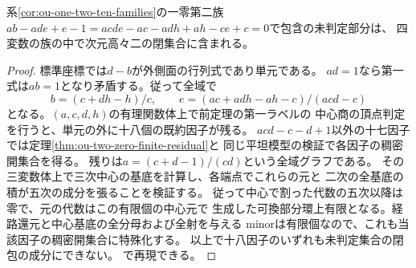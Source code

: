 \begin{corollary}[一零第二族での次元二の上界]
\label{cor:ou-one-zero-second-codim-five}
系\ref{cor:ou-one-two-ten-families}の一零第二族
$ab-ade+e-1=acde-ac-adh+ah-ce+c=0$で包含の未判定部分は、
四変数の族の中で次元高々二の閉集合に含まれる。
\end{corollary}
\begin{proof}
標準座標では$d-b$が外側面の行列式であり単元である。
$ad=1$なら第一式は$ab=1$となり矛盾する。従って全域で
\[
 b=(c+dh-h)/c,\qquad e=(ac+adh-ah-c)/(acd-c)
\]
となる。$(a,c,d,h)$の有理関数体上で前定理の第一ラベルの
中心商の頂点判定を行うと、単元の外に十八個の既約因子が残る。
$acd-c-d+1$以外の十七因子では定理\ref{thm:ou-two-zero-finite-residual}と
同じ平坦模型の検証で各因子の稠密開集合を得る。
残りは$a=(c+d-1)/(cd)$という全域グラフである。
その三変数体上で三次中心の基底を計算し、各端点でこれらの元と
二次の全基底の積が五次の成分を張ることを検証する。
従って中心で割った代数の五次以降は零で、元の代数はこの有限個の中心元で
生成した可換部分環上有限となる。経路還元と中心基底の全分母および全射を与える
minorは有限個なので、これも当該因子の稠密開集合に特殊化する。
以上で十八因子のいずれも未判定集合の閉包の成分にできない。
で再現できる。
\end{proof}

